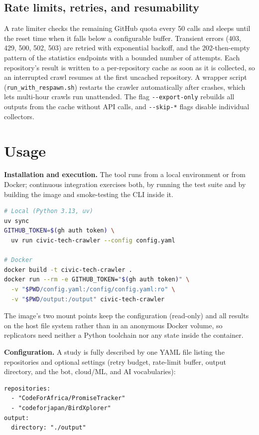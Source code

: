 \documentclass[10pt,conference]{IEEEtran}
\begin{document}
\subsection{Rate limits, retries, and resumability}

A rate limiter checks the remaining GitHub quota every 50 calls and sleeps until the reset time when it falls below a configurable buffer. Transient errors (403, 429, 500, 502, 503) are retried with exponential backoff, and the 202-then-empty pattern of the statistics endpoints with a bounded number of attempts. Each repository's result is written to a per-repository cache as soon as it is collected, so an interrupted crawl resumes at the first uncached repository. A wrapper script (\texttt{run\_with\_respawn.sh}) restarts the crawler automatically after crashes, which lets multi-hour crawls run unattended. The flag \texttt{-{}-export-only} rebuilds all outputs from the cache without API calls, and \texttt{-{}-skip-*} flags disable individual collectors.

\section{Usage}

\textbf{Installation and execution.} The tool runs from a local environment or from Docker; continuous integration exercises both, by running the test suite and by building the image and smoke-testing the CLI inside it.

\begin{lstlisting}[language=bash]
# Local (Python 3.13, uv)
uv sync
GITHUB_TOKEN=$(gh auth token) \
  uv run civic-tech-crawler --config config.yaml

# Docker
docker build -t civic-tech-crawler .
docker run --rm -e GITHUB_TOKEN="$(gh auth token)" \
  -v "$PWD/config.yaml:/config/config.yaml:ro" \
  -v "$PWD/output:/output" civic-tech-crawler
\end{lstlisting}

The image's two mount points keep the configuration (read-only) and all results on the host file system rather than in an anonymous Docker volume, so replicators need neither a Python toolchain nor any state inside the container.

\textbf{Configuration.} A study is fully described by one YAML file listing the repositories and optional settings (retry budget, rate-limit buffer, output directory, and the bot, cloud/ML, and AI vocabularies):

\begin{lstlisting}
repositories:
  - "CodeForAfrica/PromiseTracker"
  - "codeforjapan/BirdXplorer"
output:
  directory: "./output"
\end{lstlisting}
\end{document}
